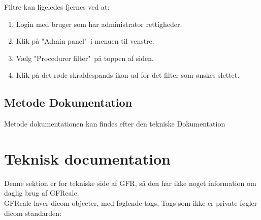 \documentclass{article}
\begin{document}
Filtre kan ligeledes fjernes ved at:
\begin{enumerate}
	\item Login med bruger som har administrator rettigheder.
	\item Klik på "Admin panel"\ i menuen til venstre.
	\item Vælg "Procedurer filter"\ på toppen af siden.
	\item Klik på det røde skraldespands ikon ud for det filter som ønskes slettet.
\end{enumerate}

\subsection{Metode Dokumentation}\label{Documentation}
Metode dokumentationen kan findes efter den tekniske Dokumentation



\section{Teknisk documentation}
Denne sektion er for tekniske side af GFR, så den har ikke noget information om daglig brug af GFRcalc.\\

GFRcalc laver dicom-objecter, med føglende tags, Tags som ikke er private føgler dicom standarden:
\end{document}
